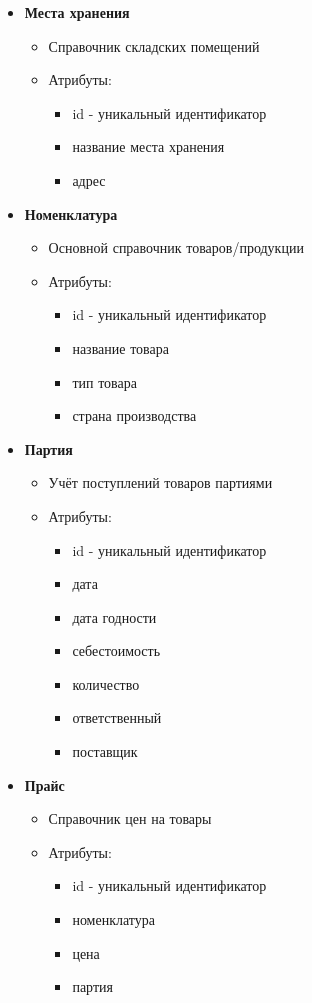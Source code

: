 \begin{itemize}
	\item \textbf{Места хранения}
	\begin{itemize}
		\item Справочник складских помещений
		\item Атрибуты:
		\begin{itemize}
			\item id - уникальный идентификатор
			\item название места хранения
			\item адрес
		\end{itemize}
	\end{itemize}
	
	\item \textbf{Номенклатура}
	\begin{itemize}
		\item Основной справочник товаров/продукции
		\item Атрибуты:
		\begin{itemize}
			\item id - уникальный идентификатор
			\item название товара
			\item тип товара
			\item страна производства
		\end{itemize}
	\end{itemize}
	
	\item \textbf{Партия}
	\begin{itemize}
		\item Учёт поступлений товаров партиями
		\item Атрибуты:
		\begin{itemize}
			\item id - уникальный идентификатор
			\item дата
			\item дата годности
			\item себестоимость
			\item количество
			\item ответственный
			\item поставщик
		\end{itemize}
	\end{itemize}
	
	\item \textbf{Прайс}
	\begin{itemize}
		\item Справочник цен на товары
		\item Атрибуты:
		\begin{itemize}
			\item id - уникальный идентификатор
			\item номенклатура
			\item цена
			\item партия
		\end{itemize}
	\end{itemize}
	
\end{itemize}
